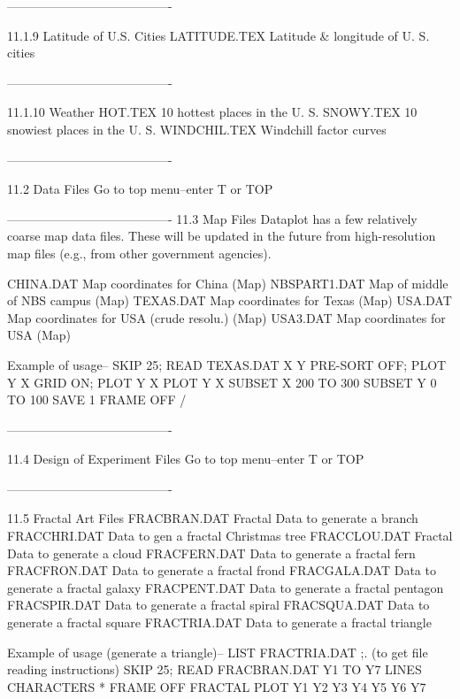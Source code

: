  
 
----------------------------------------
 
11.1.9
Latitude of U.S. Cities
      LATITUDE.TEX  Latitude & longitude of U. S. cities
 
 
 
----------------------------------------
 
11.1.10
Weather
      HOT.TEX       10 hottest places in the U. S.
      SNOWY.TEX     10 snowiest places in the U. S.
      WINDCHIL.TEX  Windchill factor curves
 
 
 
 
----------------------------------------
 
11.2
Data Files
   Go to top menu--enter T or TOP
 
----------------------------------------
11.3
Map Files
   Dataplot has a few relatively coarse map data files.
   These will be updated in the future from high-resolution
   map files (e.g., from other government agencies).
 
      CHINA.DAT       Map coordinates for China (Map)
      NBSPART1.DAT    Map of middle of NBS campus (Map)
      TEXAS.DAT       Map coordinates for Texas (Map)
      USA.DAT         Map coordinates for USA (crude resolu.) (Map)
      USA3.DAT        Map coordinates for USA (Map)
 
      Example of usage--
      SKIP 25; READ TEXAS.DAT X Y
      PRE-SORT OFF; PLOT Y X
      GRID ON; PLOT Y X
      PLOT Y X SUBSET X 200 TO 300 SUBSET Y 0 TO 100
      SAVE 1
      FRAME OFF
      /
 
----------------------------------------
 
11.4
Design of Experiment Files
   Go to top menu--enter T or TOP
 
----------------------------------------
 
11.5
Fractal Art Files
      FRACBRAN.DAT  Fractal Data to generate a branch
      FRACCHRI.DAT  Data to gen a fractal Christmas tree
      FRACCLOU.DAT  Fractal Data to generate a cloud
      FRACFERN.DAT  Data to generate a fractal fern
      FRACFRON.DAT  Data to generate a fractal frond
      FRACGALA.DAT  Data to generate a fractal galaxy
      FRACPENT.DAT  Data to generate a fractal pentagon
      FRACSPIR.DAT  Data to generate a fractal spiral
      FRACSQUA.DAT  Data to generate a fractal square
      FRACTRIA.DAT  Data to generate a fractal triangle
 
      Example of usage (generate a triangle)--
      LIST FRACTRIA.DAT ;. (to get file reading instructions)
      SKIP 25; READ FRACBRAN.DAT Y1 TO Y7
      LINES
      CHARACTERS *
      FRAME OFF
      FRACTAL PLOT Y1 Y2 Y3 Y4 Y5 Y6 Y7
 
